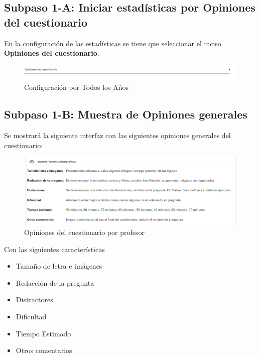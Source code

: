 \subsection{Subpaso 1-A: Iniciar estadísticas por Opiniones del cuestionario}
	En la configuración de las estadísticas se tiene que seleccionar el 
	inciso \textbf{Opiniones del cuestionario}.
		
	\begin{figure}[hbtp]

	\includegraphics[scale=0.5]{images/Interfaz/IUGS15_configuracioTodos.PNG}
	\caption{Configuración por Todos los Años }
	\end{figure}
	
	
\subsection{Subpaso 1-B: Muestra de Opiniones generales}
	Se mostrará la siguiente interfaz con las siguientes opiniones generales del 
	cuestionario:
	\begin{figure}[hbtp]
		\includegraphics[scale=0.3]{images/Interfaz/IUGS15_estadisticasTodos.PNG}
		\caption{Opiniones del cuestionario por profesor}
	\end{figure}	
	Con las siguientes características
\begin{itemize}
	\item Tamaño de letra e imágenes   
	\item Redacción de la pregunta 
	\item Distractores

	\item Dificultad
	\item Tiempo Estimado
	\item Otros comentarios 
	
\end{itemize}